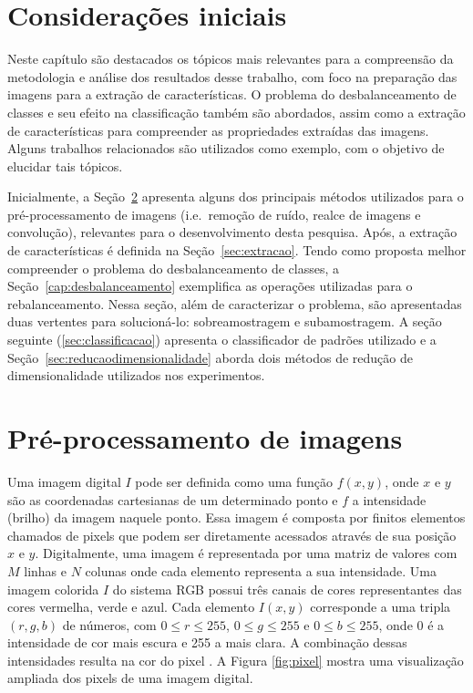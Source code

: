\section{Considerações iniciais}

Neste capítulo são destacados os tópicos mais relevantes para a compreensão da metodologia e análise dos resultados desse trabalho, com foco na preparação das imagens para a extração de características. O problema do desbalanceamento de classes e seu efeito na classificação também são abordados, assim como a extração de características para compreender as propriedades extraídas das imagens. Alguns trabalhos relacionados são utilizados como exemplo, com o objetivo de elucidar tais tópicos.

Inicialmente, a Seção~\ref{sec:preprocessamento} apresenta alguns dos principais métodos utilizados para o pré-processamento de imagens (i.e.\ remoção de ruído, realce de imagens e convolução), relevantes para o desenvolvimento desta pesquisa. Após, a extração de características é definida na Seção~\ref{sec:extracao}. Tendo como proposta melhor compreender o problema do desbalanceamento de classes, a Seção~\ref{cap:desbalanceamento} exemplifica as operações utilizadas para o rebalanceamento. Nessa seção, além de caracterizar o problema, são apresentadas duas vertentes para solucioná-lo: sobreamostragem e subamostragem. A seção seguinte (\ref{sec:classificacao}) apresenta o classificador de padrões utilizado e a Seção~\ref{sec:reducaodimensionalidade} aborda dois métodos de redução de dimensionalidade utilizados nos experimentos.

\section{Pré-processamento de imagens}
\label{sec:preprocessamento}

Uma imagem digital $I$ pode ser definida como uma função $f(x,y)$, onde $x$ e $y$ são as coordenadas cartesianas de um determinado ponto e $f$ a intensidade (brilho) da imagem naquele ponto. Essa imagem é composta por finitos elementos chamados de pixels que podem ser diretamente acessados através de sua posição $x$ e $y$. Digitalmente, uma imagem é representada por uma matriz de valores com $M$ linhas e $N$ colunas onde cada elemento representa a sua intensidade. Uma imagem colorida $I$ do sistema RGB possui três canais de cores representantes das cores vermelha, verde e azul. Cada elemento $I(x,y)$ corresponde a uma tripla $(r, g, b)$ de números, com $0 \leq r \leq 255$, $0 \leq g \leq 255$ e $0 \leq b \leq 255$, onde 0 é a intensidade de cor mais escura e 255 a mais clara. A combinação dessas intensidades resulta na cor do pixel \cite{Gonzalez2007}. A Figura \ref{fig:pixel} mostra uma visualização ampliada dos pixels de uma imagem digital.

